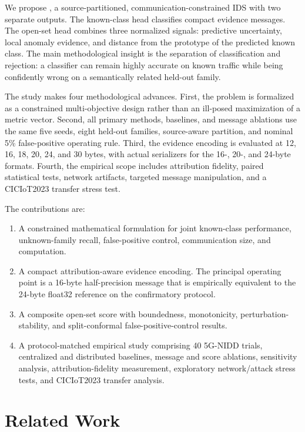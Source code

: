We propose \method{}, a source-partitioned, communication-constrained IDS with two separate outputs. The known-class head classifies compact evidence messages. The open-set head combines three normalized signals: predictive uncertainty, local anomaly evidence, and distance from the prototype of the predicted known class. The main methodological insight is the separation of classification and rejection: a classifier can remain highly accurate on known traffic while being confidently wrong on a semantically related held-out family.

The study makes four methodological advances. First, the problem is formalized as a constrained multi-objective design rather than an ill-posed maximization of a metric vector. Second, all primary methods, baselines, and message ablations use the same five seeds, eight held-out families, source-aware partition, and nominal 5\% false-positive operating rule. Third, the evidence encoding is evaluated at 12, 16, 18, 20, 24, and 30 bytes, with actual serializers for the 16-, 20-, and 24-byte formats. Fourth, the empirical scope includes attribution fidelity, paired statistical tests, network artifacts, targeted message manipulation, and a CICIoT2023 transfer stress test.

The contributions are:
\begin{enumerate}
    \item A constrained mathematical formulation for joint known-class performance, unknown-family recall, false-positive control, communication size, and computation.
    \item A compact attribution-aware evidence encoding. The principal operating point is a 16-byte half-precision message that is empirically equivalent to the 24-byte float32 reference on the confirmatory protocol.
    \item A composite open-set score with boundedness, monotonicity, perturbation-stability, and split-conformal false-positive-control results.
    \item A protocol-matched empirical study comprising 40 5G-NIDD trials, centralized and distributed baselines, message and score ablations, sensitivity analysis, attribution-fidelity measurement, exploratory network/attack stress tests, and CICIoT2023 transfer analysis.
\end{enumerate}

\section{Related Work}

